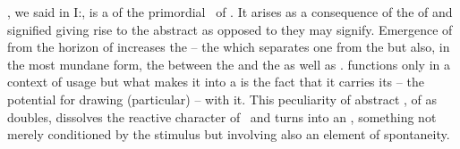 
\pa {}, we said in I:, is a  of the
primordial \nexus\ of . It arises as a consequence of the
 of  and signified giving rise to the abstract
 as opposed to  they may signify. Emergence of
 from the horizon of  increases the 
-- the  which separates one from the  but also, in the
most mundane form, the  between the  and the
 as well as  .  functions only
in a context of usage but what makes it into a  is the fact that it
carries its  -- the potential for drawing (particular)
 -- with it. This peculiarity of abstract , of
 as  doubles, dissolves the reactive
character of \oss\ and turns  into an , something not
merely conditioned by the  stimulus but involving also an element
of spontaneity.


